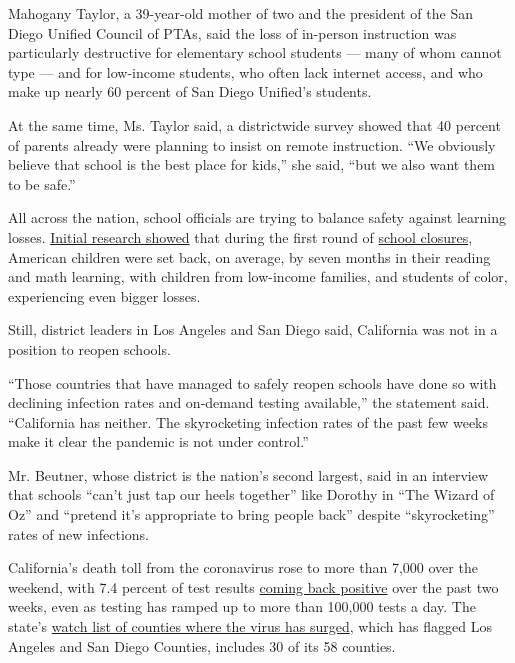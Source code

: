Mahogany Taylor, a 39-year-old mother of two and the president of the
San Diego Unified Council of PTAs, said the loss of in-person
instruction was particularly destructive for elementary school students
--- many of whom cannot type --- and for low-income students, who often
lack internet access, and who make up nearly 60 percent of San Diego
Unified's students.

At the same time, Ms. Taylor said, a districtwide survey showed that 40
percent of parents already were planning to insist on remote
instruction. ``We obviously believe that school is the best place for
kids,'' she said, ``but we also want them to be safe.''

All across the nation, school officials are trying to balance safety
against learning losses.
\href{https://www.nytimes3xbfgragh.onion/2020/06/05/us/coronavirus-education-lost-learning.html}{Initial
research showed} that during the first round of
\href{https://www.nytimes3xbfgragh.onion/2020/07/29/health/covid-school-reopening.html}{school
closures}, American children were set back, on average, by seven months
in their reading and math learning, with children from low-income
families, and students of color, experiencing even bigger losses.

Still, district leaders in Los Angeles and San Diego said, California
was not in a position to reopen schools.

``Those countries that have managed to safely reopen schools have done
so with declining infection rates and on-demand testing available,'' the
statement said. ``California has neither. The skyrocketing infection
rates of the past few weeks make it clear the pandemic is not under
control.''

Mr. Beutner, whose district is the nation's second largest, said in an
interview that schools ``can't just tap our heels together'' like
Dorothy in ``The Wizard of Oz'' and ``pretend it's appropriate to bring
people back'' despite ``skyrocketing'' rates of new infections.

California's death toll from the coronavirus rose to more than 7,000
over the weekend, with 7.4 percent of test results
\href{https://update.covid19.ca.gov/}{coming back positive} over the
past two weeks, even as testing has ramped up to more than 100,000 tests
a day. The state's
\href{https://www.cdph.ca.gov/Programs/CID/DCDC/Pages/COVID-19/CountyMonitoringDataStep2.aspx}{watch
list of counties where the virus has surged}, which has flagged Los
Angeles and San Diego Counties, includes 30 of its 58 counties.

